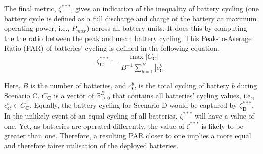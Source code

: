 The final metric, $\zeta^{***}$, gives an indication of the inequality of battery cycling (one battery cycle is defined as a full discharge and charge of the battery at maximum operating power, i.e., $P_{max}$) across all battery units. It does this by computing the the ratio between the peak and mean battery cycling. This Peak-to-Average Ratio (PAR) of batteries' cycling is defined in the following equation.
\begin{equation}
 \zeta_\textbf{C}^{***} := \frac{\max \left|C_\textbf{C}\right|}{B^{-1} \sum_{b=1}^B{\left|c_\textbf{C}^b\right|}}
 \label{equ-par}
\end{equation}

Here, $B$ is the number of batteries, and $c_\textbf{C}^b$ is the total cycling of battery $b$ during Scenario {C}. $C_\textbf{C}$ is a vector of $\mathbb{R}_{\geq 0}^{B}$ that contains all batteries' cycling values, i.e., $c_\textbf{C}^b \in C_\textbf{C}$. Equally, the battery cycling for Scenario {D} would be captured by $\zeta_\textbf{D}^{***}$. In the unlikely event of an equal cycling of all batteries, $\zeta^{***}$ will have a value of one. Yet, as batteries are operated differently, the value of $\zeta^{***}$ is likely to be greater than one. Therefore, a resulting PAR closer to one implies a more equal and therefore fairer utilisation of the deployed batteries.